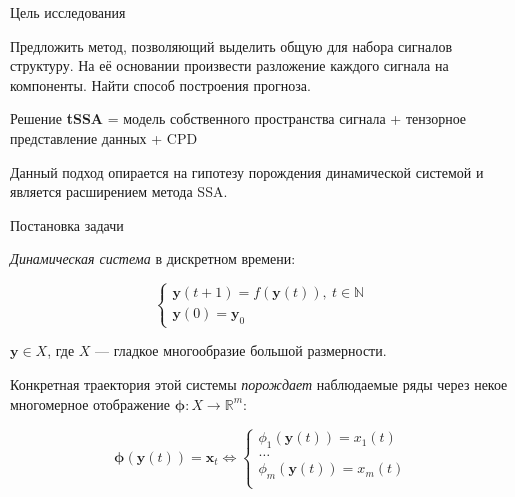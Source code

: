 	\begin{frame}{Цель исследования}
		
		Предложить метод, позволяющий выделить общую для набора сигналов структуру. На её основании произвести разложение каждого сигнала на компоненты. Найти способ построения прогноза.
		
		\begin{exampleblock}{Решение}
			\textbf{tSSA} = модель собственного пространства сигнала + тензорное представление данных + CPD
		\end{exampleblock}
		
		Данный подход опирается на гипотезу порождения динамической системой и является расширением метода SSA.
		
	\end{frame}
	
	\begin{frame}{Постановка задачи}
		
		\emph{Динамическая система} в дискретном времени:
		
		\begin{equation*}
			\begin{cases}
				\textbf{y}(t + 1) = f(\textbf{y}(t)), \ t \in \mathbb{N} \\
				\textbf{y}(0) = \textbf{y}_0
			\end{cases}
		\end{equation*}
		
		$ \textbf{y} \in X $, где $ X $ --- гладкое многообразие большой размерности. 
		
		Конкретная траектория этой системы \emph{порождает} наблюдаемые ряды через некое многомерное отображение $ \boldsymbol{\phi}: X \to \mathbb{R}^m $:
		
		\begin{equation*}
			\boldsymbol{\phi}(\textbf{y}(t)) = \textbf{x}_t \Leftrightarrow \begin{cases}
				\phi_1(\textbf{y}(t)) = x_1(t) \\
				\ldots \\
				\phi_m(\textbf{y}(t)) = x_m(t) \\
			\end{cases}
		\end{equation*}
		
	\end{frame}
	
